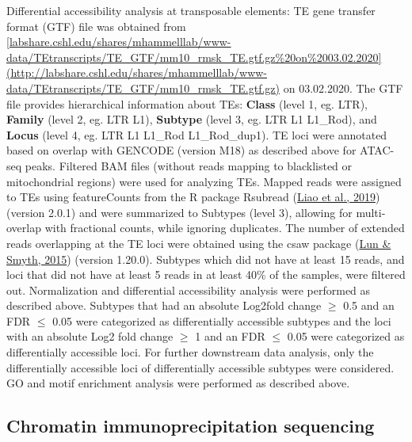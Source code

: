 \documentclass[12pt,twoside]{reedthesis}
\begin{document}
Differential accessibility analysis at transposable elements: TE gene
transfer format (GTF) file was obtained from
\href{http://labshare.cshl.edu/shares/mhammelllab/www-data/TEtranscripts/TE_GTF/mm10_rmsk_TE.gtf.gz\%20on\%2003.02.2020}{{[}labshare.cshl.edu/shares/mhammelllab/www-data/TEtranscripts/TE\_GTF/mm10\_rmsk\_TE.gtf.gz\%20on\%2003.02.2020{]}(http://labshare.cshl.edu/shares/mhammelllab/www-data/TEtranscripts/TE\_GTF/mm10\_rmsk\_TE.gtf.gz)}
on 03.02.2020. The GTF file provides hierarchical information about TEs:
\textbf{Class} (level 1, eg. LTR), \textbf{Family} (level 2, eg. LTR L1),
\textbf{Subtype} (level 3, eg. LTR L1 L1\_Rod), and \textbf{Locus} (level 4, eg.
LTR L1 L1\_Rod L1\_Rod\_dup1). TE loci were annotated based on overlap with
GENCODE (version M18) as described above for ATAC-seq peaks. Filtered
BAM files (without reads mapping to blacklisted or mitochondrial
regions) were used for analyzing TEs. Mapped reads were assigned to TEs
using featureCounts from the R package Rsubread (\protect\hyperlink{ref-liao2019}{Liao et al., 2019}) (version
2.0.1) and were summarized to Subtypes (level 3), allowing for
multi-overlap with fractional counts, while ignoring duplicates. The
number of extended reads overlapping at the TE loci were obtained using
the csaw package (\protect\hyperlink{ref-lun2015}{Lun \& Smyth, 2015}) (version 1.20.0). Subtypes which did not
have at least 15 reads, and loci that did not have at least 5 reads in
at least 40\% of the samples, were filtered out. Normalization and
differential accessibility analysis were performed as described above.
Subtypes that had an absolute Log2fold change \(\geq\) 0.5 and an FDR
\(\leq\) 0.05 were categorized as differentially accessible subtypes and
the loci with an absolute Log2 fold change \(\geq\) 1 and an FDR \(\leq\)
0.05 were categorized as differentially accessible loci. For further
downstream data analysis, only the differentially accessible loci of
differentially accessible subtypes were considered. GO and motif
enrichment analysis were performed as described above.

\hypertarget{chromatin-immunoprecipitation-sequencing}{%
\subsection{Chromatin immunoprecipitation sequencing}\label{chromatin-immunoprecipitation-sequencing}}
\end{document}
